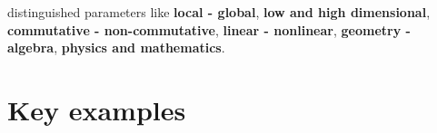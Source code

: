 \documentclass[12pt]{amsart}
\newcounter{example}    \def\example#1{ \item \fontsize{12}{15} \selectfont #1 \fontsize{12}{15} \selectfont }
\begin{document}
distinguished parameters like {\bf local - global},  {\bf low and high dimensional},
{\bf commutative - non-commutative}, {\bf linear - nonlinear}, {\bf geometry - algebra},
{\bf physics and mathematics}. 
\begin{comment}
One could add 
{\bf regularity- randomness}, {\bf integrable- non-integrable}, {\bf invariants- perturbations},
{\bf experimental-deductive}, {\bf polynomial- exponential}, {\bf applied-abstract}, {\bf discrete-continuous},
{\bf existence- construction}, {\bf finite dim-infinite dimensional},
{\bf topological - differential geometric}, {\bf practical- theoretical}, {\bf axiomatic- case based}.
See the core handouts of Math E320 which are attached below. 
\end{comment}

\section*{Key examples} 
\end{document}
